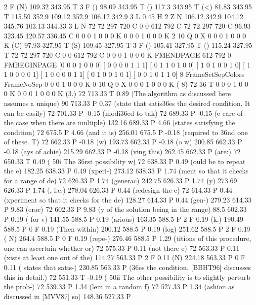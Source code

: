 2 F
(N) 109.32 343.95 T
3 F
() 98.09 343.95 T
() 117.3 343.95 T
(<) 81.83 343.95 T
115.59 352.9 109.12 352.9 106.12 342.9 3 L
0.45 H
2 Z
N
106.12 342.9 104.12 345.76 103.13 344.33 3 L
N
72 72 297 720 C
0 0 612 792 C
72 72 297 720 C
96.93 323.45 120.57 336.45 C
0 0 0 1 0 0 0 K
0 0 0 1 0 0 0 K
2 10 Q
0 X
0 0 0 1 0 0 0 K
(C) 97.93 327.95 T
(S) 109.45 327.95 T
3 F
() 105.41 327.95 T
() 115.24 327.95 T
72 72 297 720 C
0 0 612 792 C
0 0 0 1 0 0 0 K
FMENDPAGE
612 792 0 FMBEGINPAGE
[0 0 0 1 0 0 0]
[ 0 0 0 0 1 1 1]
[ 0 1 1 0 1 0 0]
[ 1 0 1 0 0 1 0]
[ 1 1 0 0 0 0 1]
[ 1 0 0 0 0 1 1]
[ 0 1 0 0 1 0 1]
[ 0 0 1 0 1 1 0]
 8 FrameSetSepColors
FrameNoSep
0 0 0 1 0 0 0 K
0 10 Q
0 X
0 0 0 1 0 0 0 K
(                                                                                        8) 72 36 T
0 0 0 1 0 0 0 K
0 0 0 1 0 0 0 K
(3.) 72 713.33 T
0.89 (The algorithm as discussed here assumes a unique) 90 713.33 P
0.37 (state that satis\336es the desired condition. It can be easily) 72 701.33 P
-0.15 (modi\336ed to tak) 72 689.33 P
-0.15 (e care of the case when there are multiple) 132.16 689.33 P
4.66 (states satisfying the condition) 72 675.5 P
4.66 (and it is) 256.01 675.5 P
-0.18 (required to \336nd one of these. T) 72 662.33 P
-0.18 (w) 193.73 662.33 P
-0.18 (o w) 200.85 662.33 P
-0.18 (ays of achie) 215.29 662.33 P
-0.18 (ving this) 262.45 662.33 P
(are:) 72 650.33 T
0.49 (   \050i The \336rst possibility w) 72 638.33 P
0.49 (ould be to repeat the e) 182.25 638.33 P
0.49 (xperi-) 273.12 638.33 P
1.74 (ment so that it checks for a range of de) 72 626.33 P
1.74 (generac) 242.75 626.33 P
1.74 (y) 273.69 626.33 P
1.74 (, i.e.) 278.04 626.33 P
0.44 (redesign the e) 72 614.33 P
0.44 (xperiment so that it checks for the de) 128.27 614.33 P
0.44 (gen-) 279.23 614.33 P
9.83 (erac) 72 602.33 P
9.83 (y of the solution being in the range) 88.5 602.33 P
0.19 ( for v) 141.55 588.5 P
0.19 (arious) 163.35 588.5 P
2 F
0.19 (k.) 190.49 588.5 P
0 F
0.19 (Then within) 200.12 588.5 P
0.19 (log) 251.62 588.5 P
2 F
0.19 ( N) 264.4 588.5 P
0 F
0.19 (repe-) 276.46 588.5 P
1.29 (titions of this procedure, one can ascertain whether or) 72 575.33 P
0.11 (not there e) 72 563.33 P
0.11 (xists at least one out of the) 114.27 563.33 P
2 F
0.11 (N) 224.18 563.33 P
0 F
0.11 ( states that satis-) 230.85 563.33 P
(\336es the condition. [BBHT96] discusses this in detail.) 72 551.33 T
-0.19 (   \050ii The other possibility is to slightly perturb the prob-) 72 539.33 P
1.34 (lem in a random f) 72 527.33 P
1.34 (ashion as discussed in [MVV87] so) 148.36 527.33 P
